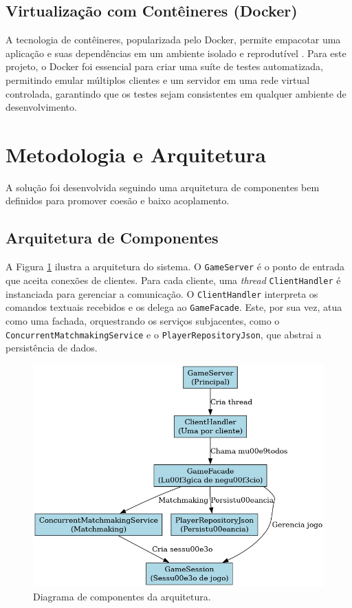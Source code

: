 \documentclass[corpo=12pt,a4paper]{sbc-artigos}
\begin{document}
\subsection{Virtualização com Contêineres (Docker)}
A tecnologia de contêineres, popularizada pelo Docker, permite empacotar uma aplicação e suas dependências em um ambiente isolado e reprodutível \cite{merkel2014docker}. Para este projeto, o Docker foi essencial para criar uma suíte de testes automatizada, permitindo emular múltiplos clientes e um servidor em uma rede virtual controlada, garantindo que os testes sejam consistentes em qualquer ambiente de desenvolvimento.

\section{Metodologia e Arquitetura}

A solução foi desenvolvida seguindo uma arquitetura de componentes bem definidos para promover coesão e baixo acoplamento.

\subsection{Arquitetura de Componentes}
A Figura \ref{fig:arquitetura} ilustra a arquitetura do sistema. O \texttt{GameServer} é o ponto de entrada que aceita conexões de clientes. Para cada cliente, uma \textit{thread} \texttt{ClientHandler} é instanciada para gerenciar a comunicação. O \texttt{ClientHandler} interpreta os comandos textuais recebidos e os delega ao \texttt{GameFacade}. Este, por sua vez, atua como uma fachada, orquestrando os serviços subjacentes, como o \texttt{ConcurrentMatchmakingService} e o \texttt{PlayerRepositoryJson}, que abstrai a persistência de dados.

\begin{figure}[h]
\centering
\includegraphics[width=0.9\columnwidth]{figuras/arquitetura.png}
\caption{Diagrama de componentes da arquitetura.}
\label{fig:arquitetura}
\end{figure}
\end{document}

